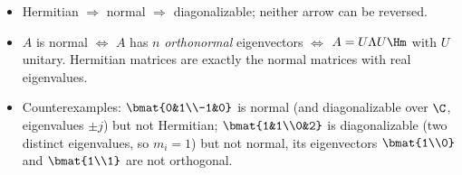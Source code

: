 \begin{insight}
\begin{itemize}[nosep]
\item Hermitian $\Rightarrow$ normal $\Rightarrow$ diagonalizable; neither arrow can be reversed.
\item $A$ is normal $\iff$ $A$ has $n$ \emph{orthonormal} eigenvectors $\iff$ $A=U\Lambda U\Hm$ with $U$ unitary. Hermitian matrices are exactly the normal matrices with real eigenvalues.
\item Counterexamples: $\bmat{0&1\\-1&0}$ is normal (and diagonalizable over $\C$, eigenvalues $\pm j$) but not Hermitian; $\bmat{1&1\\0&2}$ is diagonalizable (two distinct eigenvalues, so $m_i=1$) but not normal, its eigenvectors $\bmat{1\\0}$ and $\bmat{1\\1}$ are not orthogonal.
\end{itemize}
\end{insight}
